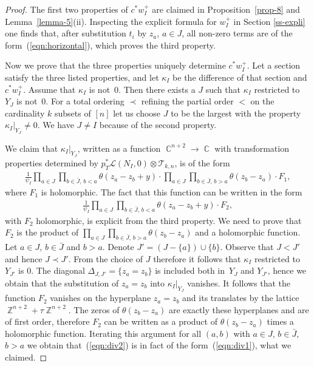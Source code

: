 \documentclass[pdftex]{sigma}
\numberwithin{equation}{section}
\DeclareMathOperator\C{\mathbb C}
\DeclareMathOperator\Z{\mathbb Z}
\begin{document}
\begin{proof}The first two properties of $c ^*w^+_I$ are claimed in Proposition~\ref{prop-8} and Lem\-ma~\ref{lemma-5}(ii). Inspecting the explicit formula for $w^+_I$ in Section \ref{ss-expli} one finds that, after substitution $t_i$ by $z_a$, $a\in J$, all non-zero terms are of the form~(\ref{eqn:horizontal}), which proves the third property.

Now we prove that the three properties uniquely determine $c ^*w_I^+$. Let a section satisfy the three listed properties, and let $\kappa_I$ be the difference of that section and $c ^*w_I^+$.
Assume that $\kappa_I$ is not~0. Then there exists a $J$ such that $\kappa_I$ restricted to~$Y_J$ is not~0. For a total ordering $\prec$ refining the partial order $<$ on the cardinality $k$ subsets of $[n]$ let us choose $J$ to be the largest with the property $\kappa_I|_{Y_J}\not=0$. We have $J\not=I$ because of the second property.

We claim that $\kappa_I|_{Y_J}$, written as a function $\C^{n+2}\to \C$ with transformation properties determined by $p_T^*\mathcal L(N_I,0)\otimes \mathcal T_{k,n}$, is of the form
\begin{gather}\label{eqn:div1}
\frac{1}{\psi_I} \prod_{a\in J} \prod_{b\in \bar J,\, b<a} \theta(z_a-z_b+y) \cdot \prod_{a\in J} \prod_{b\in \bar J,\,b>a} \theta(z_b-z_a)\cdot F_1,
\end{gather}
where $F_1$ is holomorphic. The fact that this function can be written in the form
\begin{gather}\label{eqn:div2}
\frac{1}{\psi_I} \prod_{a\in J}\prod_{b\in\bar J,\,b<a} \theta(z_a-z_b+y) \cdot F_2,
\end{gather}
with $F_2$ holomorphic, is explicit from the third property. We need to prove that $F_2$ is the product of $\prod\limits_{a\in J}\prod\limits_{b\in\bar J,\, b>a} \theta(z_b-z_a)$ and a holomorphic function. Let $a\in J$, $b\in \bar{J}$ and $b>a$. Denote $J'=(J-\{a\})\cup \{b\}$. Observe that $J<J'$ and hence $J\prec J'$. From the choice of $J$ therefore it follows that $\kappa_I$ restricted to $Y_{J'}$ is 0. The diagonal $\Delta_{J,J'}=\{z_a=z_b\}$ is included both in~$Y_J$ and $Y_{J'}$, hence we obtain that the substitution of $z_a=z_b$ into $\kappa_I|_{Y_J}$ vanishes. It follows that the function $F_2$ vanishes on the hyperplane $z_a=z_b$ and its translates by the lattice $\Z^{n+2}+\tau\Z^{n+2}$. The zeros of $\theta(z_b-z_a)$ are exactly these hyperplanes and are of first order, therefore $F_2$ can be written as a product of $\theta(z_b-z_a)$ times a holomorphic function. Iterating this argument for all $(a,b)$ with $a\in J$, $b\in \bar{J}$, $b>a$ we obtain that~(\ref{eqn:div2}) is in fact of the form~(\ref{eqn:div1}), what we claimed.


\end{proof}
\end{document}
